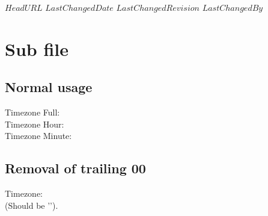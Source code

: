 \svnidlong
{$HeadURL$}
{$LastChangedDate$}
{$LastChangedRevision$}
{$LastChangedBy$}


\section{Sub file}

\subsection{Normal usage}
Timezone Full:   \svnfiletimezone\\
Timezone Hour:   \svnfiletimezonehour\\
Timezone Minute: \svnfiletimezoneminute\\

\subsection{Removal of trailing 00}
Timezone: \\
(Should be '\svnfiletimezone').

